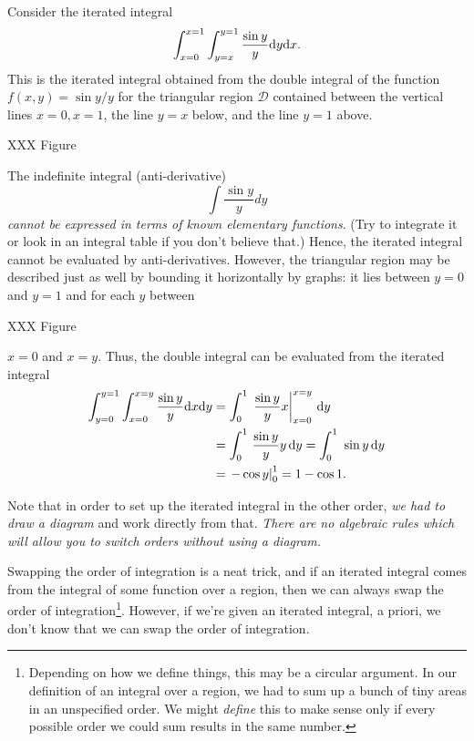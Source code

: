 \begin{example}
	Consider the iterated integral
	\[
		\int_{x=0}^{x=1}\int_{y=x}^{y=1} \frac{\sin y}{y}\mathrm{d} y \mathrm{d} x.
	\]
	This is the iterated integral obtained from the double integral
	of the function $f(x,y) = \sin y/y$ for the triangular
	region $\mathcal D$ contained
	between the vertical lines  $x = 0, x = 1$, the line
	$y = x$ below, and the line $y = 1$ above.

	XXX Figure

	   The indefinite
	integral (anti-derivative) 
	\[
	     \int \frac{\sin y}y dy
	\]
	{\it cannot be expressed in terms of known elementary functions}.
	(Try to integrate it or look in an integral table if you don't
	believe that.)   Hence, the iterated integral cannot be evaluated
	by anti-derivatives.  However, the triangular region may be
	described just as well by bounding it horizontally by graphs:
	it lies between $y = 0$ and $y = 1$ and for each $y$ between

	XXX Figure

	$x = 0$ and $x = y$.  
	 Thus, the double integral can be evaluated
	from the  iterated integral
	\begin{align*}
		\int_{y=0}^{y=1}\int_{x=0}^{x=y}\frac{\sin y}y\mathrm{d} x\mathrm{d} y &=
		\int_0^1\, \left. \frac{\sin y}y x\right|_{x=0}^{x=y}\, \mathrm{d} y  \\
		&= \int_0^1\,  \frac{\sin y}y y\, \mathrm{d} y
		= \int_0^1\ \sin y\, \mathrm{d} y  \\
		&= \left. -\cos y\right|_0^1 = 1 - \cos 1.
	\end{align*}

	Note that in order to set up the iterated integral in the other
	order, \emph{we had to draw a diagram} and work directly from
	that.   \emph{There are no algebraic rules which will allow you
	to switch orders without using a diagram.}
\end{example}

Swapping the order of integration is a neat trick, and if an
iterated integral comes from the integral of some function over a
region, then we can always swap the order of integration\footnote{ Depending
on how we define things, this may be a circular argument.  In our definition
of an integral over a region, we had to sum up a bunch of tiny areas in an unspecified
order.  We might \emph{define} this to make sense only if every possible order we could
sum results in the same number.}.  However, if we're given an iterated integral,
a priori, we don't know that we can swap the order of integration.

